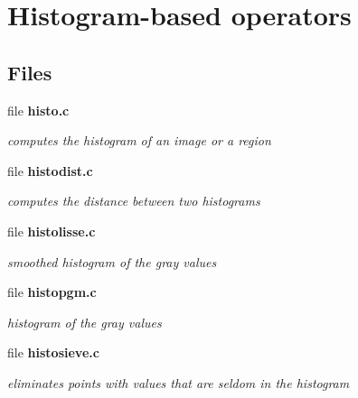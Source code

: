 \section{Histogram-\/based operators}
\label{group__histo}
\subsection*{Files}
\begin{DoxyCompactItemize}
\item 
file {\bf histo.c}


\begin{DoxyCompactList}\small\item\em computes the histogram of an image or a region \item\end{DoxyCompactList}

\item 
file {\bf histodist.c}


\begin{DoxyCompactList}\small\item\em computes the distance between two histograms \item\end{DoxyCompactList}

\item 
file {\bf histolisse.c}


\begin{DoxyCompactList}\small\item\em smoothed histogram of the gray values \item\end{DoxyCompactList}

\item 
file {\bf histopgm.c}


\begin{DoxyCompactList}\small\item\em histogram of the gray values \item\end{DoxyCompactList}

\item 
file {\bf histosieve.c}


\begin{DoxyCompactList}\small\item\em eliminates points with values that are seldom in the histogram \item\end{DoxyCompactList}


\end{DoxyCompactItemize}
